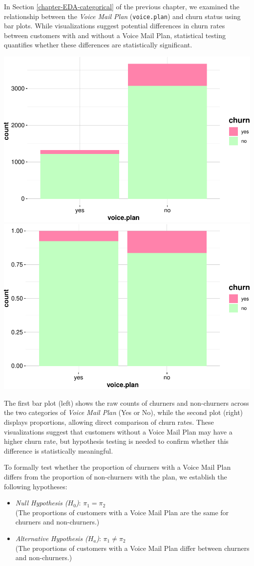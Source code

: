 \documentclass[
]{book}
\newcommand{\passthrough}[1]{#1}
\theoremstyle{definition}
\theoremstyle{definition}
\theoremstyle{definition}
\theoremstyle{definition}
\theoremstyle{remark}
\begin{document}
In Section \ref{chapter-EDA-categorical} of the previous chapter, we examined the relationship between the \emph{Voice Mail Plan} (\passthrough{\lstinline!voice.plan!}) and churn status using bar plots. While visualizations suggest potential differences in churn rates between customers with and without a Voice Mail Plan, statistical testing quantifies whether these differences are statistically significant.

\includegraphics[width=0.5\linewidth]{statistics_files/figure-latex/unnamed-chunk-11-1} \includegraphics[width=0.5\linewidth]{statistics_files/figure-latex/unnamed-chunk-11-2}

The first bar plot (left) shows the raw counts of churners and non-churners across the two categories of \emph{Voice Mail Plan} (Yes or No), while the second plot (right) displays proportions, allowing direct comparison of churn rates. These visualizations suggest that customers without a Voice Mail Plan may have a higher churn rate, but hypothesis testing is needed to confirm whether this difference is statistically meaningful.

To formally test whether the proportion of churners with a Voice Mail Plan differs from the proportion of non-churners with the plan, we establish the following hypotheses:

\begin{itemize}
\item
  \emph{Null Hypothesis (\(H_0\))}: \(\pi_1 = \pi_2\)\\
  (The proportions of customers with a Voice Mail Plan are the same for churners and non-churners.)
\item
  \emph{Alternative Hypothesis (\(H_a\))}: \(\pi_1 \neq \pi_2\)\\
  (The proportions of customers with a Voice Mail Plan differ between churners and non-churners.)
\end{itemize}
\end{document}
